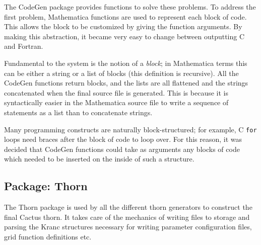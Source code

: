 \documentclass{report}
\begin{document}
The CodeGen package provides functions to solve these problems.  To
address the first problem, Mathematica functions are used to represent
each block of code.  This allows the block to be customized by giving
the function arguments.  By making this abstraction, it became very
easy to change between outputting C and Fortran.

Fundamental to the system is the notion of a {\em block}; in
Mathematica terms this can be either a string or a list of blocks
(this definition is recursive).  All the CodeGen functions return
blocks, and the lists are all flattened and the strings concatenated
when the final source file is generated.  This is because it is
syntactically easier in the Mathematica source file to write a
sequence of statements as a list than to concatenate strings.

Many programming constructs are naturally block-structured; for
example, C {\tt for} loops need braces after the block of code to loop
over.  For this reason, it was decided that CodeGen functions could
take as arguments any blocks of code which needed to be inserted on
the inside of such a structure.

\subsection{Package: Thorn}

The Thorn package is used by all the different thorn generators to
construct the final Cactus thorn. It takes care of the mechanics of
writing files to storage and parsing the Kranc structures necessary
for writing parameter configuration files, grid function definitions
etc.
\end{document}

